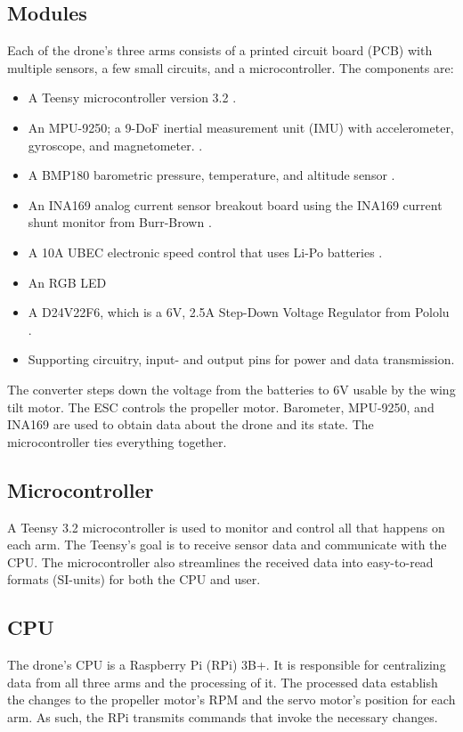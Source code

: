 \subsection{Modules} 
Each of the drone's three arms consists of a printed circuit board (PCB) with multiple sensors, a few small circuits, and a microcontroller. 
The components are:
\begin{itemize}
    \item A Teensy microcontroller version 3.2 \cite{teensy32}.
    \item An MPU-9250; a 9-DoF inertial measurement unit (IMU) with accelerometer, gyroscope, and magnetometer. \cite{mpu-9250}.
    \item A BMP180 barometric pressure, temperature, and altitude sensor \cite{BMP180}.
    \item An INA169 analog current sensor breakout board using the INA169 current shunt monitor from Burr-Brown \cite{INA169}.
    \item A 10A UBEC electronic speed control that uses Li-Po batteries \cite{HK10AESC}.
    \item An RGB LED
    \item A D24V22F6, which is a 6V, 2.5A Step-Down Voltage Regulator from Pololu \cite{PololuStepDown}.
    \item Supporting circuitry, input- and output pins for power and data transmission.
\end{itemize}
The converter steps down the voltage from the batteries to 6V usable by the wing tilt motor. The ESC controls the propeller motor. Barometer, MPU-9250, and INA169 are used to obtain data about the drone and its state. The microcontroller ties everything together.

\subsection{Microcontroller}
A Teensy 3.2 microcontroller is used to monitor and control all that happens on each arm. The Teensy's goal is to receive sensor data and communicate with the CPU. The microcontroller also streamlines the received data into easy-to-read formats (SI-units) for both the CPU and user.

\subsection{CPU} %
The drone's CPU is a Raspberry Pi (RPi) 3B+. It is responsible for centralizing data from all three arms and the processing of it. The processed data establish the changes to the propeller motor's RPM and the servo motor's position for each arm. As such, the RPi transmits commands that invoke the necessary changes. 

